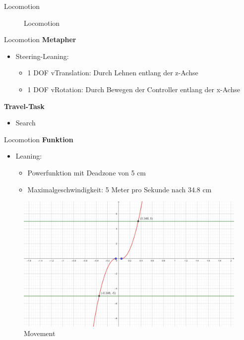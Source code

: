 \documentclass{beamer}
\begin{document}
\begin{frame}{Locomotion}
\begin{figure}
    \centering
\caption{Locomotion}
\end{figure}
\end{frame}

\begin{frame}{Locomotion}
\textbf{Metapher}
\begin{itemize}
\item Steering-Leaning:\begin{itemize}
\item 1 DOF vTranslation: Durch Lehnen entlang der z-Achse
\item 1 DOF vRotation: Durch Bewegen der Controller entlang der x-Achse
\end{itemize}
\end{itemize}
\textbf{Travel-Task}
\begin{itemize}
\item Search
\end{itemize}
\end{frame}

\begin{frame}{Locomotion}
\textbf{Funktion}
\begin{itemize}
\item Leaning:\begin{itemize}
\item Powerfunktion mit Deadzone von 5 cm
\item Maximalgeschwindigkeit: 5 Meter pro Sekunde nach 34.8 cm
\end{itemize}
\end{itemize}
\begin{figure}
\centering
\includegraphics[width=.7\textwidth, keepaspectratio]{img/Movement}
\caption{Movement}
\end{figure}
\end{frame}
\end{document}
